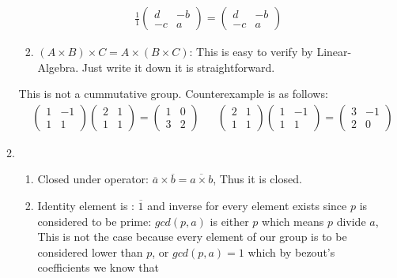\documentclass{article}
\begin{document}
\begin{itemize}
\begin{enumerate}[label=(\alph*)]
\begin{enumerate}[label=(\Roman*)]
\begin{align*}
					\frac{1}{1} \left(\begin{matrix} d & -b \\ -c & a \end{matrix}\right)=
					\left(\begin{matrix} d & -b \\ -c & a \end{matrix}\right)
				\end{align*}
				\item $(A \times B) \times C = A \times (B \times C)$: This is easy to verify by Linear-Algebra. Just write it down 
					it is straightforward.
			  \end{enumerate}
			  This is not a cummutative group. Counterexample is as follows:
			  \begin{align*}
				&\left(\begin{matrix} 1 & -1 \\ 1 & 1 \end{matrix}\right) \left(\begin{matrix} 2 & 1 \\ 1 & 1 \end{matrix}\right)
				= \left(\begin{matrix} 1 & 0 \\ 3 & 2 \end{matrix}\right)
				&&
				\left(\begin{matrix} 2 & 1 \\ 1 & 1 \end{matrix}\right) \left(\begin{matrix} 1 & -1 \\ 1 & 1 \end{matrix}\right)=
				\left(\begin{matrix} 3 & -1 \\ 2 & 0 \end{matrix}\right)	
			  \end{align*}
			  \item
				  \begin{enumerate}[label=(\Roman*)]
					  \item Closed under operator: $\overline{a} \times  \overline{b} = \overline{a \times b}$, Thus it is closed.
					  \item Identity element is : $\overline{1}$ and inverse for every element exists since $p$ is considered to be prime:
						$gcd(p, a)$ is either $p$ which means $p$ divide $a$, This is not the case because every element of our 
						group is to be considered lower than $p$, or $gcd(p,a)=1$ which by bezout's coefficients we know that 

\end{enumerate}
\end{enumerate}
\end{itemize}
\end{document}
